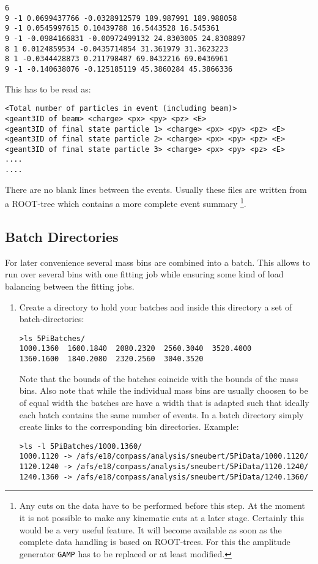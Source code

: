 \documentclass[12pt,a4paper]{article}
\begin{document}
{\begin{enumerate}
\begin{verbatim}
6
9 -1 0.0699437766 -0.0328912579 189.987991 189.988058
9 -1 0.0545997615 0.10439788 16.5443528 16.545361
9 -1 -0.0984166831 -0.00972499132 24.8303005 24.8308897
8 1 0.0124859534 -0.0435714854 31.361979 31.3623223
8 1 -0.0344428873 0.211798487 69.0432216 69.0436961
9 -1 -0.140638076 -0.125185119 45.3860284 45.3866336
\end{verbatim}
This has to be read as:
\begin{verbatim}
<Total number of particles in event (including beam)>
<geant3ID of beam> <charge> <px> <py> <pz> <E>
<geant3ID of final state particle 1> <charge> <px> <py> <pz> <E>
<geant3ID of final state particle 2> <charge> <px> <py> <pz> <E>
<geant3ID of final state particle 3> <charge> <px> <py> <pz> <E>
....
....
\end{verbatim}
There are no blank lines between the events. Usually these files are written from a ROOT-tree which contains a more complete event summary \footnote{Any cuts on the data have to be performed before this step. At the moment it is not possible to make any kinematic cuts at a later stage. Certainly this would be a very useful feature. It will become available as soon as the complete data handling is based on ROOT-trees. For this the amplitude generator {\tt GAMP} has to be replaced or at least modified.}.

\end{enumerate}
\subsection{Batch Directories}
For later convenience several mass bins are combined into a batch. This allows to run over several bins with one fitting job while ensuring some kind of load balancing between the fitting jobs.
\begin{enumerate}
\item Create a directory to hold your batches and inside this directory a set of batch-directories:
\begin{verbatim}
>ls 5PiBatches/
1000.1360  1600.1840  2080.2320  2560.3040  3520.4000
1360.1600  1840.2080  2320.2560  3040.3520
\end{verbatim}
Note that the bounds of the batches coincide with the bounds of the mass bins. Also note that while the individual mass bins are usually choosen to be of equal width the batches are have a width that is adapted such that ideally each batch contains the same number of events. In a batch directory simply create links to the corresponding bin directories. Example:
\begin{verbatim}
>ls -l 5PiBatches/1000.1360/
1000.1120 -> /afs/e18/compass/analysis/sneubert/5PiData/1000.1120/
1120.1240 -> /afs/e18/compass/analysis/sneubert/5PiData/1120.1240/
1240.1360 -> /afs/e18/compass/analysis/sneubert/5PiData/1240.1360/
\end{verbatim}
\end{enumerate}

}
\end{document}
